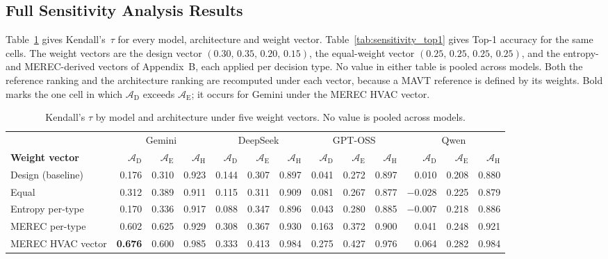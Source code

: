 \documentclass[11pt]{article}
\begin{document}
\subsection{Full Sensitivity Analysis Results}
\label{app:sensitivity_full}

Table~\ref{tab:sensitivity_by_model} gives Kendall's~$\tau$ for every model,
architecture and weight vector. Table~\ref{tab:sensitivity_top1} gives Top-1
accuracy for the same cells. The weight vectors are the design vector
$(0.30,\,0.35,\,0.20,\,0.15)$, the equal-weight vector
$(0.25,\,0.25,\,0.25,\,0.25)$, and the entropy- and MEREC-derived vectors of
Appendix~B, each applied per decision type. No
value in either table is pooled across models.
 Both the reference ranking and the architecture ranking are recomputed under each vector, because a MAVT reference is defined by its weights. Bold marks the one cell in which $\mathcal{A}_{\text{D}}$ exceeds $\mathcal{A}_{\text{E}}$; it occurs for Gemini under the MEREC HVAC vector.
\begin{table}[htbp]
\centering
\footnotesize
\centering
\caption{Kendall's $\tau$ by model and architecture under five weight vectors. No value is pooled across models.}
\label{tab:sensitivity_by_model}
\renewcommand{\arraystretch}{1.15}
\setlength{\tabcolsep}{4pt}
\begin{tabular}{@{} l rrr rrr rrr rrr @{}}
\toprule
 & \multicolumn{3}{c}{Gemini} & \multicolumn{3}{c}{DeepSeek} & \multicolumn{3}{c}{GPT-OSS} & \multicolumn{3}{c}{Qwen} \\
\cmidrule(lr){2-4}\cmidrule(lr){5-7}\cmidrule(lr){8-10}\cmidrule(lr){11-13}
\textbf{Weight vector} & $\mathcal{A}_{\text{D}}$ & $\mathcal{A}_{\text{E}}$ & $\mathcal{A}_{\text{H}}$ & $\mathcal{A}_{\text{D}}$ & $\mathcal{A}_{\text{E}}$ & $\mathcal{A}_{\text{H}}$ & $\mathcal{A}_{\text{D}}$ & $\mathcal{A}_{\text{E}}$ & $\mathcal{A}_{\text{H}}$ & $\mathcal{A}_{\text{D}}$ & $\mathcal{A}_{\text{E}}$ & $\mathcal{A}_{\text{H}}$ \\
\midrule
Design (baseline)  & 0.176 & 0.310 & 0.923 & 0.144 & 0.307 & 0.897 & 0.041 & 0.272 & 0.897 & 0.010 & 0.208 & 0.880 \\
Equal              & 0.312 & 0.389 & 0.911 & 0.115 & 0.311 & 0.909 & 0.081 & 0.267 & 0.877 & $-$0.028 & 0.225 & 0.879 \\
\midrule
Entropy per-type   & 0.170 & 0.336 & 0.917 & 0.088 & 0.347 & 0.896 & 0.043 & 0.280 & 0.885 & $-$0.007 & 0.218 & 0.886 \\
\midrule
MEREC per-type     & 0.602 & 0.625 & 0.929 & 0.308 & 0.367 & 0.930 & 0.163 & 0.372 & 0.900 & 0.041 & 0.248 & 0.921 \\
MEREC HVAC vector  & \textbf{0.676} & 0.600 & 0.985 & 0.333 & 0.413 & 0.984 & 0.275 & 0.427 & 0.976 & 0.064 & 0.282 & 0.984 \\
\bottomrule
\end{tabular}
\renewcommand{\arraystretch}{1.0}
\setlength{\tabcolsep}{6pt}
\end{table}
\end{document}
